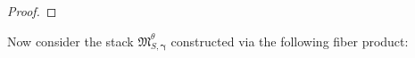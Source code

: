 \documentclass[12pt, oneside]{amsart}   	%
\newcommand{\NN}{\mathbb{N}}
\newcommand{\ZZ}{\mathbb{Z}}
\newcommand{\kk}{\mathds{k}}
\numberwithin{equation}{section}
\numberwithin{thm}{section}
\numberwithin{figure}{section}
\begin{document}
\begin{proof}
%
%
%
%
\end{proof}





Now consider the stack $\mathfrak{M}^\theta_{S,\pmb\gamma}$ constructed via the following fiber product:
\end{document}
